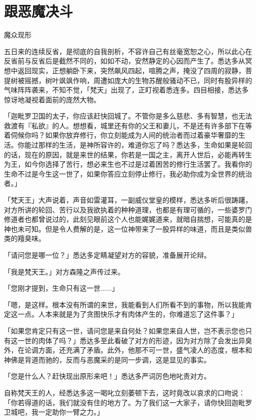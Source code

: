 \documentclass[12pt,twoside,openany]{book}
\begin{document}
\section{跟恶魔决斗}\label{sec1.15}

魔众现形

五日来的连续反省，是彻底的自我剖析，不容许自己有丝毫宽恕之心，所以此心在反省前与反省后是截然不同的，如如不动，安然静定的心因而产生了。悉达多从冥想中返回现实，正想躺卧下来，突然飙风四起，喧腾之声，掩没了四周的寂静，菩提树被摇撼，树叶飒飒作响，周遭如庞大的生物苏醒般骚动不已，同时有股异样的气味阵阵袭来，不知不觉，「梵天」出现了，正盯视着悉连多。四目相接，悉达多惊讶地凝视着面前的庞然大物。

「迦毗罗卫国的太子，你应该赶快回城了。不管你是多么慈悲、多有智慧，也无法救渡有『私欲』的人。想想看，城里还有你的父王和妻儿，不是还有许多部下在等着伺候你吗？如果你放弃修行，你立刻能成为人间的统治者而过着豪华奢靡的生活。你能过那样的生活，是神所容许的，难道你忘了吗？悉达多，生命如果是轮回的话，现在的原因，就是来世的结果，你若是一国之主，离开人世后，必能再转生为王，如今你选择了苦行，想必来生也不过是过着困苦的修行生活罢了。我看你的生命不过是今生这一世了，如果你答应立刻停止修行，我必助你成为全世界的统治者。」

「梵天王」大声说着，声音如雷灌耳，一副威仪堂皇的模样，悉达多听后很踌躇，对方所讲的轮回、苦行以及我欲执着的种种道理，也都是有理可循的，一些婆罗门修道者也都曾说过的，此刻见眼前这个人也能娓娓道来，就暗自揣想，可能真的是神也未可知。但是令人费解的是，这一位神带来了一股异样的味道，而且是类似兽类的羶臭味。

「请问您是哪一位？」悉达多定睛凝望对方的容貌，准备展开论辩。

「我是梵天王。」对方森隆之声传过来。

「您刚才提到，生命只有这一世......」

「嗯，是这样。根本没有所谓的来世，我能看到人们所看不到的事物，所以我能肯定这一点。人本来就是为了贪图快乐才有肉体产生的，你难道忘了这件事？」

「如果您肯定只有这一世，请问您是来自何处？如果您来自人世，岂不表示您也只有这一世的肉体了吗？」悉达多至此看破了对方的形迹，因为对方除了会发出异臭外，在论调方面，还充满了矛盾。此外，他那不可一世，盛气凌人的态度，根本和神佛是背道而驰的，反而与恶魔采的是同一步调，这是显见的事实。

「您是什么人？赶快现出原形来吧！」悉达多严词厉色地叱责对方。

自称梵天王的人，经悉达多这一喝叱立刻萎顿下去，这时竟改以哀求的口吻说：「你若得道的话，我们就没有住的地方了。为了我们这一大家子，请你快回迦毗罗卫城吧，我一定助你一臂之力。」
\end{document}
